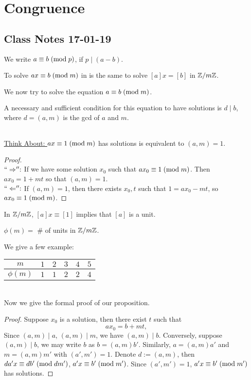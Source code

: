 \documentclass{mynotes}
\begin{document}
\chapter{Congruence}
\section{Class Notes 17-01-19}
\begin{definition}
We write $a\equiv b\;(\mbox{mod}{\;p})$, if $p\mid (a-b)$.
\end{definition}
\begin{remark}
To solve $ax\equiv b\;(\mbox{mod}{\;m})$ in \Z{} is the same to solve $[a]x=[b]$ in $\mathbb{Z}/m\mathbb{Z}$.
\end{remark}
We now try to solve the equation $a\equiv b\;(\mbox{mod}{\;m})$.
\begin{proposition}
A necessary and sufficient condition for this equation to have solutions is $d\mid b$, where $d=(a,m)$ is the gcd of $a$ and $m$.
\end{proposition}
\mbox{}\\\underline{Think About: }
$ax\equiv 1\;(\mbox{mod}{\;m})$ has solutions is equivalent to $(a,m) = 1$.
\begin{proof}\mbox{}\\
$``\Rightarrow'':$ If we have some solution $x_0$ such that $ax_0\equiv 1\;(\mbox{mod}{\;m})$. Then $ax_0=1+mt$ so that $(a,m)= 1$.\\
$``\Leftarrow'': $ If $(a,m) = 1$, then there exists $x_0, t$ such that $1=ax_0-mt$, so $ax_0\equiv 1\;(\mbox{mod}{\;m})$.
\end{proof}
\begin{remark}
In $\mathbb{Z}/m\mathbb{Z}$, $[a]x\equiv[1]$ implies that $[a]$ is a unit. 
\end{remark}
\begin{definition}
$\phi(m) =$ \# of units in $\mathbb{Z}/m\mathbb{Z}$. 
\end{definition}
We give a few example:\quad
\begin{tabular}{|c|c|c|c|c|c|}\hline
$m$ & $1$ & $2$ & $3$ & $4$ & $5$\\\hline
$\phi(m)$ & $1$ & $1$ & $2$ & $2$ & $4$\\\hline
\end{tabular}\\[6pt]
Now we give the formal proof of our proposition.
\begin{proof}
Suppose $x_0$ is a solution, then there exist $t$ such that $$ax_0=b+mt,$$ Since $(a,m)\mid a$, $(a,m)\mid m$, we have $(a,m)\mid b$. Conversely, suppose $(a,m)\mid b$, we may write $b$ as $b= (a,m)b'$. Similarly, $a=(a,m)a'$ and $m=(a,m)m'$ with $(a',m')=1$. Denote $d:=(a,m)$, then $da'x\equiv db'\;(\mbox{mod}{\;dm'})$, $a'x\equiv b'\;(\mbox{mod}{\;m'})$. Since $(a',m')=1$, $a'x\equiv b'\;(\mbox{mod}{\;m'})$ has solutions.
\end{proof}
\end{document}
